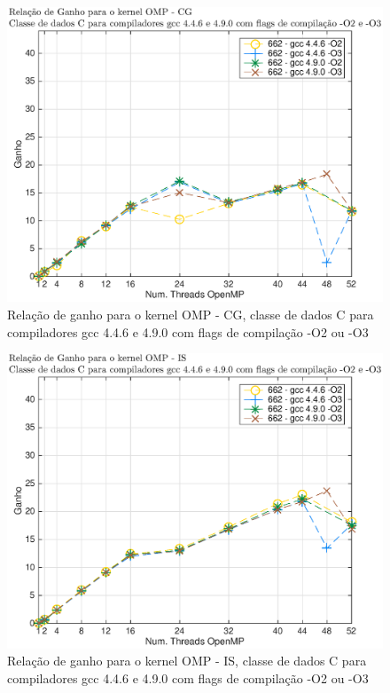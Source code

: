 \documentclass[conference,compsoc]{IEEEtran}
\begin{document}
\begin{figure}[H]
\centering
\includegraphics[width=1.1\columnwidth]{EPS/OMP/ganho_compiladores_cg.eps}
\caption{Relação de ganho para o kernel OMP - CG, classe de dados C para  compiladores gcc 4.4.6 e 4.9.0 com flags de compilação -O2 ou -O3}
\label{ganho_compiladores_cg_c}
\end{figure}

\begin{figure}[H]
\centering
\includegraphics[width=1.1\columnwidth]{EPS/OMP/ganho_compiladores_is.eps}
\caption{Relação de ganho para o kernel OMP - IS, classe de dados C para  compiladores gcc 4.4.6 e 4.9.0 com flags de compilação -O2 ou -O3}
\label{ganho_compiladores_is_c}
\end{figure}
\end{document}
